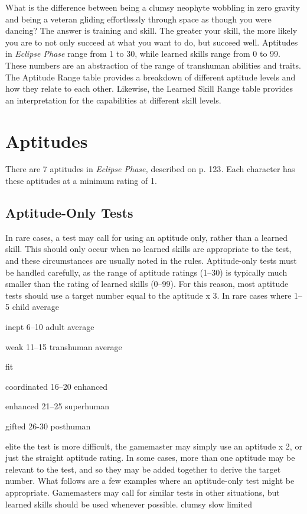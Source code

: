 What is the difference between being a clumsy neophyte
wobbling in zero gravity and being a veteran
gliding effortlessly through space as though you were 
dancing? The answer is training and skill. The greater 
your skill, the more likely you are to not only succeed 
at what you want to do, but succeed well.
Aptitudes in \textit{Eclipse Phase} range from 1 to 30, 
while learned skills range from 0 to 99. These numbers
are an abstraction of the range of transhuman
abilities and traits. The Aptitude Range table provides 
a breakdown of different aptitude levels and how they 
relate to each other. Likewise, the Learned Skill Range 
table provides an interpretation for the capabilities at 
different skill levels.

\section{Aptitudes}

There are 7 aptitudes in \textit{Eclipse Phase, }described on p. 
123\textit{.} Each character has these aptitudes at a minimum 
rating of 1.

\subsection{Aptitude-Only Tests}

In rare cases, a test may call for using an aptitude 
only, rather than a learned skill. This should only 
occur when no learned skills are appropriate to the 
test, and these circumstances are usually noted in 
the rules.
Aptitude-only tests must be handled carefully, as 
the range of aptitude ratings (1–30) is typically much 
smaller than the rating of learned skills (0–99). For 
this reason, most aptitude tests should use a target 
number equal to the aptitude x 3. In rare cases where 
1–5
child average

inept
6–10
adult average

weak
11–15
transhuman average

fit

coordinated
16–20
enhanced

enhanced
21–25
superhuman

gifted
26-30
posthuman

elite
the test is more difficult, the gamemaster may simply 
use an aptitude x 2, or just the straight aptitude rating. 
In some cases, more than one aptitude may be relevant
to the test, and so they may be added together
to derive the target number.
What follows are a few examples where an aptitude-only
test might be appropriate. Gamemasters may call
for similar tests in other situations, but learned skills 
should be used whenever possible.
clumsy
slow
limited

